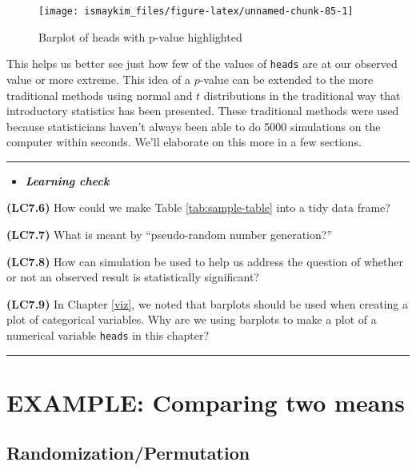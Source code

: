 \documentclass[]{tufte-book}
\let\oldrule=\rule
\renewcommand{\rule}[1]{\oldrule{\linewidth}}
\newenvironment{rmdblock}[1]
  {\begin{shaded*}
  \begin{itemize}
  \renewcommand{\labelitemi}{
    \raisebox{-.7\height}[0pt][0pt]{
    }
  }
  \item
  }
  {
  \end{itemize}
  \end{shaded*}
  }
\newenvironment{learncheck}
  {\begin{rmdblock}{warning}}
  {\end{rmdblock}}
\begin{document}
\begin{figure}

{\centering \texttt{[image: ismaykim\_files/figure-latex/unnamed-chunk-85-1]} 

}

\caption[Barplot of heads with p-value highlighted]{Barplot of heads with p-value highlighted}\label{fig:unnamed-chunk-85}
\end{figure}

This helps us better see just how few of the values of \texttt{heads}
are at our observed value or more extreme. This idea of a \(p\)-value
can be extended to the more traditional methods using normal and \(t\)
distributions in the traditional way that introductory statistics has
been presented. These traditional methods were used because
statisticians haven't always been able to do 5000 simulations on the
computer within seconds. We'll elaborate on this more in a few sections.

\begin{center}\rule{0.5\linewidth}{\linethickness}\end{center}

\begin{learncheck}
\textbf{\emph{Learning check}}
\end{learncheck}

\textbf{(LC7.6)} How could we make Table \ref{tab:sample-table} into a
tidy data frame?

\textbf{(LC7.7)} What is meant by ``pseudo-random number generation?''

\textbf{(LC7.8)} How can simulation be used to help us address the
question of whether or not an observed result is statistically
significant?

\textbf{(LC7.9)} In Chapter \ref{viz}, we noted that barplots should be
used when creating a plot of categorical variables. Why are we using
barplots to make a plot of a numerical variable \texttt{heads} in this
chapter?

\begin{center}\rule{0.5\linewidth}{\linethickness}\end{center}

\section{EXAMPLE: Comparing two
means}\label{example-comparing-two-means}

\subsection{Randomization/Permutation}\label{randomizationpermutation}
\end{document}
